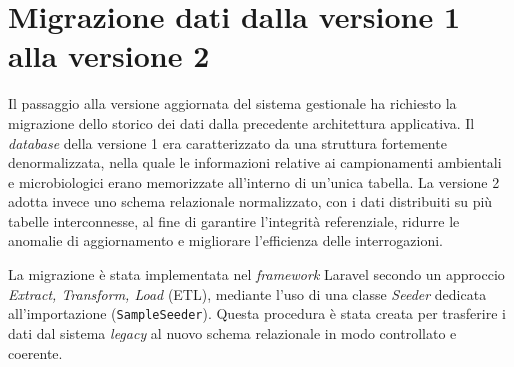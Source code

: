 \section{Migrazione dati dalla versione 1 alla versione 2}
Il passaggio alla versione aggiornata del sistema gestionale ha richiesto la migrazione dello storico dei dati dalla precedente architettura applicativa. Il \textit{database} della versione 1 era caratterizzato da una struttura fortemente denormalizzata, nella quale le informazioni relative ai campionamenti ambientali e microbiologici erano memorizzate all'interno di un'unica tabella. La versione 2 adotta invece uno schema relazionale normalizzato, con i dati distribuiti su più tabelle interconnesse, al fine di garantire l'integrità referenziale, ridurre le anomalie di aggiornamento e migliorare l'efficienza delle interrogazioni.

La migrazione è stata implementata nel \textit{framework} Laravel secondo un approccio \textit{Extract, Transform, Load} (ETL), mediante l'uso di una classe \textit{Seeder} dedicata all'importazione (\texttt{SampleSeeder}). Questa procedura è stata creata per trasferire i dati dal sistema \textit{legacy} al nuovo schema relazionale in modo controllato e coerente.


